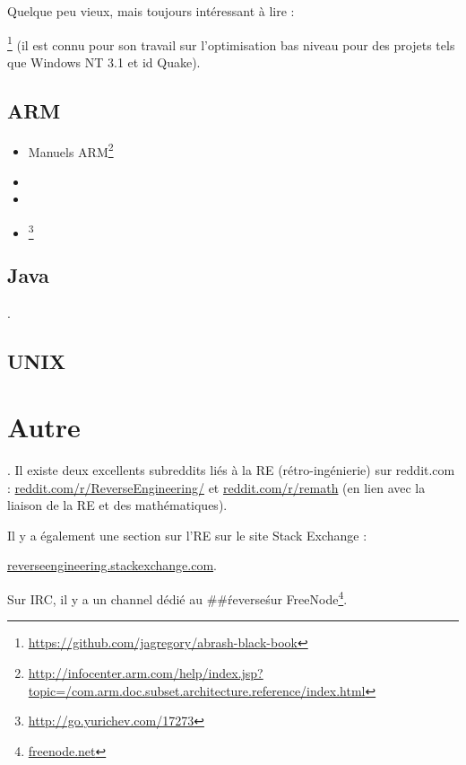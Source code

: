 Quelque peu vieux, mais toujours intéressant à lire :

\MAbrash\footnote{\AlsoAvailableAs \url{https://github.com/jagregory/abrash-black-book}}
(il est connu pour son travail sur l'optimisation bas niveau pour des projets tels que Windows NT 3.1 et id Quake).

\subsection{ARM}

\begin{itemize}
\item Manuels ARM\footnote{\AlsoAvailableAs \url{http://infocenter.arm.com/help/index.jsp?topic=/com.arm.doc.subset.architecture.reference/index.html}}

\item \ARMSevenRef

\item \ARMSixFourRefURL

\item \ARMCookBook\footnote{\AlsoAvailableAs \url{http://go.yurichev.com/17273}}
\end{itemize}

\subsection{Java}

\JavaBook.

\subsection{UNIX}

\TAOUP



\section{Autre}

\HenryWarren.
Il existe deux excellents subreddits liés à la \ac{RE} (rétro-ingénierie) sur reddit.com :
\href{http://go.yurichev.com/17027}{reddit.com/r/ReverseEngineering/} et
\href{http://go.yurichev.com/17028}{reddit.com/r/remath}
(en lien avec la liaison de la \ac{RE} et des mathématiques).

Il y a également une section sur l'\ac{RE} sur le site Stack Exchange :

\par \href{http://go.yurichev.com/17029}{reverseengineering.stackexchange.com}.

Sur IRC, il y a un channel dédié au \#\#\'reverse\' sur
FreeNode\footnote{\href{http://go.yurichev.com/17030}{freenode.net}}.

